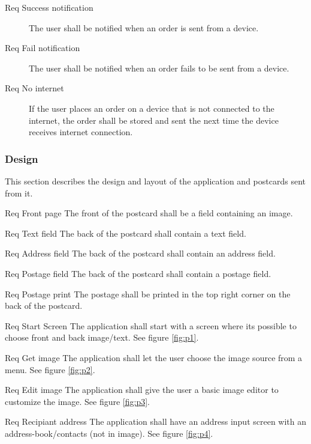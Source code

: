 \documentclass[10pt,a4paper]{article}
\begin{document}
\begin{description}
	\item [Req \thesubsubsection {.\theproduct} Success notification] The user shall be notified when an order is sent from a device.
	\item [Req \thesubsubsection {.\theproduct} Fail notification] The user shall be notified when an order fails to be sent from a device.

	\item [Req \thesubsubsection {.\theproduct} No internet] If the user places an order on a device that is not connected to the internet, the order shall be stored and sent the next time the device receives internet connection. 
\end{description}

\subsubsection{Design}
This section describes the design and layout of the application and postcards sent from it. 

\begin {description}
	\item [Req \thesubsubsection {.\thedesign} Front page] The front of the postcard shall be a field containing an image.
	\item [Req \thesubsubsection {.\thedesign} Text field] The back of the postcard shall contain a text field.
	\item [Req \thesubsubsection {.\thedesign} Address field] The back of the postcard shall contain an address field.
	\item [Req \thesubsubsection {.\thedesign} Postage field] The back of the postcard shall contain a postage field. 
	\item [Req \thesubsubsection {.\thedesign} Postage print] The postage shall be printed in the top right corner on the back of the postcard. 


	\item [Req \thesubsubsection {.\thedesign} Start Screen] The application shall start with a screen where its possible to choose front and back image/text. See figure \ref{fig:p1}.
	\item [Req \thesubsubsection {.\thedesign} Get image] The application shall let the user choose the image source from a menu. See figure \ref{fig:p2}.
	\item [Req \thesubsubsection {.\thedesign} Edit image]The application shall give the user a basic image editor to customize the image. See figure \ref{fig:p3}.
	\item [Req \thesubsubsection {.\thedesign} Recipiant address] The application shall have an address input screen with an address-book/contacts (not in image). See figure \ref{fig:p4}.
\end{description}
\end{document}
